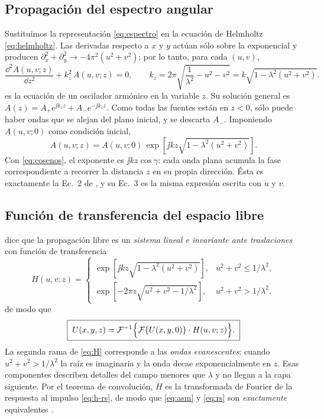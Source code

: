 \subsection{Propagación del espectro angular}

Sustituimos la representación \eqref{eq:espectro} en la ecuación de Helmholtz
\eqref{eq:helmholtz}. Las derivadas respecto a $x$ y $y$ actúan sólo sobre la exponencial y
producen $\partial_x^2+\partial_y^2\to-4\pi^2(u^2+v^2)$; por lo tanto, para cada $(u,v)$,
\begin{equation}
  \frac{\dd^2A(u,v;z)}{\dd z^2}+k_z^2\,A(u,v;z)=0,
  \qquad k_z=2\pi\sqrt{\frac{1}{\lambda^2}-u^2-v^2}=k\sqrt{1-\lambda^2(u^2+v^2)} .
  \label{eq:edo}
\end{equation}
 es la ecuación de un oscilador armónico en la variable $z$. Su solución
general es $A(z)=A_+e^{\jj k_zz}+A_-e^{-\jj k_zz}$. Como todas las fuentes están en $z<0$, sólo
puede haber ondas que se alejan del plano inicial, y se descarta $A_-$. Imponiendo
$A(u,v;0)$ como condición inicial,
\begin{equation}
  A(u,v;z)=A(u,v;0)\,\exp\!\left[\jj kz\sqrt{1-\lambda^2\left(u^2+v^2\right)}\right].
  \label{eq:prop-espectro}
\end{equation}
Con \eqref{eq:cosenos}, el exponente es $\jj kz\cos\gamma$: cada onda plana acumula la fase
correspondiente a recorrer la distancia $z$ en su propia dirección. Ésta es exactamente la
Ec.~2 de \textcite{chen2021}, y su Ec.~3 es la misma expresión escrita con $u$ y $v$.

\subsection{Función de transferencia del espacio libre}

 dice que la propagación libre es un \emph{sistema lineal e
invariante ante traslaciones} con función de transferencia
\begin{equation}
  H(u,v;z)=
  \begin{cases}
    \exp\!\left[\jj kz\sqrt{1-\lambda^2(u^2+v^2)}\right], & u^2+v^2\le 1/\lambda^2,\\[6pt]
    \exp\!\left[-2\pi z\sqrt{u^2+v^2-1/\lambda^2}\right], & u^2+v^2> 1/\lambda^2,
  \end{cases}
  \label{eq:H}
\end{equation}
de modo que
\begin{equation}
  \boxed{\;U(x,y,z)=\mathcal{F}^{-1}\Bigl\{\mathcal{F}\{U(x,y,0)\}\cdot H(u,v;z)\Bigr\}.\;}
  \label{eq:asm}
\end{equation}
La segunda rama de \eqref{eq:H} corresponde a las \emph{ondas evanescentes}: cuando
$u^2+v^2>1/\lambda^2$ la raíz es imaginaria y la onda decae exponencialmente en $z$. Esas
componentes describen detalles del campo menores que $\lambda$ y no llegan a la capa
siguiente. Por el teorema de convolución, $H$ es la transformada de Fourier de la respuesta
al impulso \eqref{eq:h-rs}, de modo que \eqref{eq:asm} y \eqref{eq:rs} son
\emph{exactamente} equivalentes \parencite[sec.~3.10]{goodman2005}.

